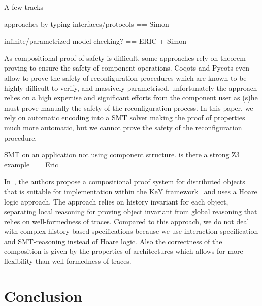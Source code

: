 \documentclass{llncs}
\begin{document}
A few tracks

approaches by typing interfaces/protocols == Simon

infinite/parametrized model checking? == ERIC + Simon

As compositional proof of safety is difficult, some approaches rely on theorem proving to ensure the safety of component operations. Coqots and Pycots\cite{BCDLM:CBSE2014} even allow to prove the safety of reconfiguration procedures which are known to be highly difficult to verify, and massively parametrised. unfortunately the approach relies on a high expertise and significant efforts from the component user as (s)he must prove manually the safety of the reconfiguration process. In this paper, we rely on automatic encoding into a SMT solver making the proof of properties much more automatic, but we cannot prove the safety of the reconfiguration procedure.


SMT on an application not using component structure. is there a strong Z3 example == Eric

In~\cite{DDJO:JLAMP2012}, the authors propose a compositional proof system for distributed objects that is suitable for implementation within the KeY framework~\cite{BHS:Key2007} and uses a Hoare logic approach.
The approach relies on history invariant for each object, separating local reasoning for proving object invariant from global reasoning that relies on well-formedness of traces. Compared to this  approach, we do not  deal with complex history-based specifications because we use interaction specification and SMT-reasoning instead of Hoare logic. Also the correctness of the composition is given by the properties of architectures which allows for more flexibility than well-formedness of traces.








\section{Conclusion}
\label{secn:conclusion}




\end{document}
